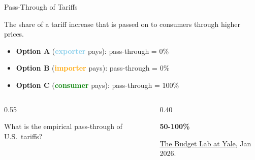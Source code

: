 \documentclass[9pt,english,aspectratio=169]{beamer}
\begin{document}
\begin{frame}{Pass-Through of Tariffs}

  \begin{definitionbox}
    The share of a tariff increase that is passed on to consumers through higher prices.
  \end{definitionbox}

  \vspace{0.8em}
  \begin{itemize}
    \item \textbf{Option A} (\textcolor{skyblue}{\textbf{exporter}} pays): pass-through = 0\%
    \item \textbf{Option B} (\textcolor{orange}{\textbf{importer}} pays): pass-through = 0\%
    \item \textbf{Option C} (\textcolor{green}{\textbf{consumer}} pays): pass-through = 100\%
  \end{itemize} \pause

  \vspace{0.8em}
  \begin{columns}[c]
    \begin{column}{0.55\textwidth}
      \begin{questionbox}
        What is the empirical pass-through of U.S.\ tariffs? 
      \end{questionbox}
    \end{column}
    \begin{column}{0.40\textwidth}
      \pause
      \begin{answerbox}
        \centering
        {\Large \textbf{50-100\%}}
      \end{answerbox}

      \vspace{0.3em}
      {\tiny \href{https://budgetlab.yale.edu/research/tracking-economic-effects-tariffs}{The Budget Lab at Yale}, Jan 2026.}
    \end{column}
  \end{columns}

\end{frame}
\end{document}
